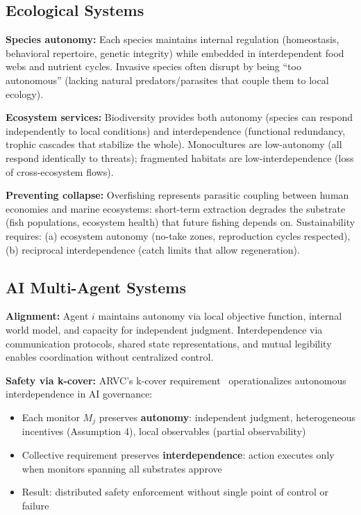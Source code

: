 \documentclass[11pt,a4paper]{article}
\begin{document}
\subsection{Ecological Systems}

\textbf{Species autonomy:} Each species maintains internal regulation (homeostasis, behavioral repertoire, genetic integrity) while embedded in interdependent food webs and nutrient cycles. Invasive species often disrupt by being ``too autonomous'' (lacking natural predators/parasites that couple them to local ecology).

\textbf{Ecosystem services:} Biodiversity provides both autonomy (species can respond independently to local conditions) and interdependence (functional redundancy, trophic cascades that stabilize the whole). Monocultures are low-autonomy (all respond identically to threats); fragmented habitats are low-interdependence (loss of cross-ecosystem flows).

\textbf{Preventing collapse:} Overfishing represents parasitic coupling between human economies and marine ecosystems: short-term extraction degrades the substrate (fish populations, ecosystem health) that future fishing depends on. Sustainability requires: (a) ecosystem autonomy (no-take zones, reproduction cycles respected), (b) reciprocal interdependence (catch limits that allow regeneration).

\subsection{AI Multi-Agent Systems}

\textbf{Alignment:} Agent $i$ maintains autonomy via local objective function, internal world model, and capacity for independent judgment. Interdependence via communication protocols, shared state representations, and mutual legibility enables coordination without centralized control.

\textbf{Safety via k-cover:} ARVC's k-cover requirement~\cite{arvc} operationalizes autonomous interdependence in AI governance:
\begin{itemize}
    \item Each monitor $M_j$ preserves \textbf{autonomy}: independent judgment, heterogeneous incentives (Assumption 4), local observables (partial observability)
    \item Collective requirement preserves \textbf{interdependence}: action executes only when monitors spanning all substrates approve
    \item Result: distributed safety enforcement without single point of control or failure
\end{itemize}
\end{document}
